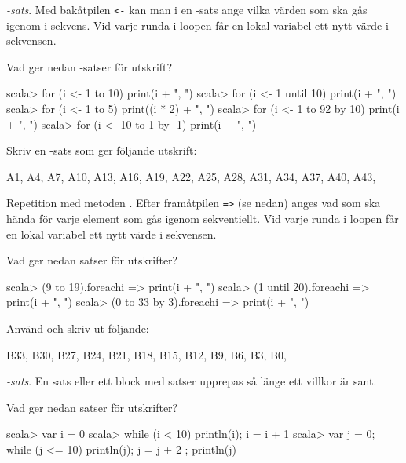 {{{{{{{\Subtask {}

\Subtask {}


\Task {}\textit{-sats}.  Med bakåtpilen \texttt{<-} kan man i en -sats ange vilka värden som ska gås igenom i sekvens. Vid varje runda i loopen får en lokal variabel ett nytt värde i sekvensen. %

\Subtask Vad ger nedan -satser för utskrift?

\begin{REPL}
scala> for (i <- 1 to 10) print(i + ", ")
scala> for (i <- 1 until 10) print(i + ", ")
scala> for (i <- 1 to 5) print((i * 2) + ", ")
scala> for (i <- 1 to 92 by 10) print(i + ", ")
scala> for (i <- 10 to 1 by -1) print(i + ", ")
\end{REPL}

\Subtask Skriv en -sats som ger följande utskrift:
\begin{REPLnonum}
A1, A4, A7, A10, A13, A16, A19, A22, A25, A28, A31, A34, A37, A40, A43,
\end{REPLnonum}

\Task Repetition med metoden . Efter framåtpilen \texttt{=>} (se nedan) anges vad som ska hända för varje element som gås igenom sekventiellt. Vid varje runda i loopen får en lokal variabel ett nytt värde i sekvensen.   %

\Subtask Vad ger nedan satser för utskrifter?

\begin{REPL}
scala> (9 to 19).foreach{i => print(i + ", ")}
scala> (1 until 20).foreach{i => print(i + ", ")}
scala> (0 to 33 by 3).foreach{i => print(i + ", ")}
\end{REPL}

\Subtask Använd  och skriv ut följande:
\begin{REPLnonum}
B33, B30, B27, B24, B21, B18, B15, B12, B9, B6, B3, B0,
\end{REPLnonum}

\Task {}\textit{-sats}. En sats eller ett block med satser upprepas så länge ett villkor är sant.  %

\Subtask Vad ger nedan satser för utskrifter?
\begin{REPL}
scala> var i = 0
scala> while (i < 10) { println(i); i = i + 1 }
scala> var j = 0; while (j <= 10) { println(j); j = j + 2 }; println(j)
\end{REPL}

}}}}}}}
